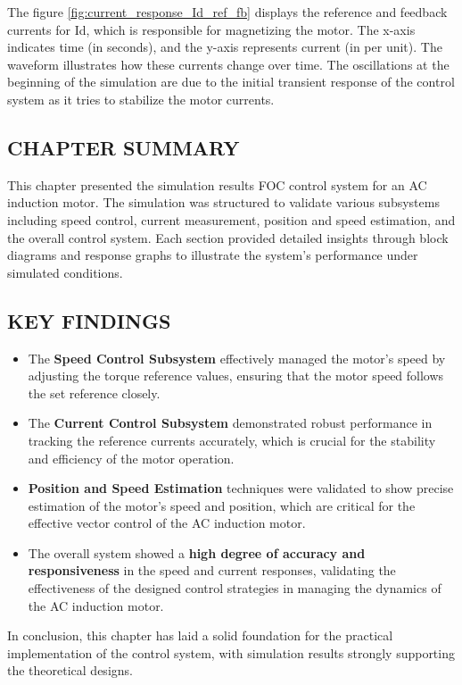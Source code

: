 The figure \ref{fig:current_response_Id_ref_fb}  displays the reference and feedback currents for Id, which is responsible for magnetizing the motor. The x-axis indicates time (in seconds), and the y-axis represents current (in per unit). The waveform illustrates how these currents change over time. The oscillations at the beginning of the simulation are due to the initial transient response of the control system as it tries to stabilize the motor currents.


\subsection{CHAPTER SUMMARY}

This chapter presented the simulation results FOC control system for an AC induction motor. The simulation was structured to validate various subsystems including speed control, current measurement, position and speed estimation, and the overall control system. Each section provided detailed insights through block diagrams and response graphs to illustrate the system's performance under simulated conditions.

\subsection{KEY FINDINGS}

\begin{itemize}
    \item The \textbf{Speed Control Subsystem} effectively managed the motor's speed by adjusting the torque reference values, ensuring that the motor speed follows the set reference closely.
    \item The \textbf{Current Control Subsystem} demonstrated robust performance in tracking the reference currents accurately, which is crucial for the stability and efficiency of the motor operation.
    \item \textbf{Position and Speed Estimation} techniques were validated to show precise estimation of the motor's speed and position, which are critical for the effective vector control of the AC induction motor.
    \item The overall system showed a \textbf{high degree of accuracy and responsiveness} in the speed and current responses, validating the effectiveness of the designed control strategies in managing the dynamics of the AC induction motor.
\end{itemize}

In conclusion, this chapter has laid a solid foundation for the practical implementation of the control system, with simulation results strongly supporting the theoretical designs.


\newpage